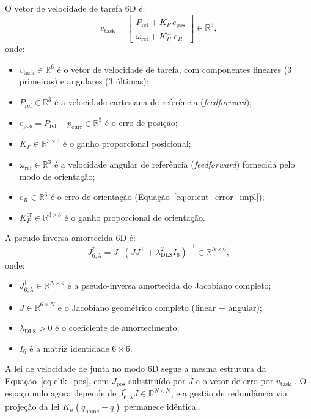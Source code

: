 O vetor de velocidade de tarefa 6D é:
\begin{equation}
    v_{\text{task}} = \begin{bmatrix} \dot{P}_{\text{ref}} + K_P\,e_{\text{pos}} \\ \omega_{\text{ref}} + K_P^{\text{or}}\,e_R \end{bmatrix} \in \mathbb{R}^6,
    \label{eq:task_vel_6d}
\end{equation}
onde:
\begin{itemize}
    \item $v_{\text{task}} \in \mathbb{R}^6$ é o vetor de velocidade de tarefa, com componentes lineares (3 primeiras) e angulares (3 últimas);
    \item $\dot{P}_{\text{ref}} \in \mathbb{R}^3$ é a velocidade cartesiana de referência (\textit{feedforward});
    \item $e_{\text{pos}} = P_{\text{ref}} - p_{\text{curr}} \in \mathbb{R}^3$ é o erro de posição;
    \item $K_P \in \mathbb{R}^{3\times 3}$ é o ganho proporcional posicional;
    \item $\omega_{\text{ref}} \in \mathbb{R}^3$ é a velocidade angular de referência (\textit{feedforward}) fornecida pelo modo de orientação;
    \item $e_R \in \mathbb{R}^3$ é o erro de orientação (Equação~\eqref{eq:orient_error_impl});
    \item $K_P^{\text{or}} \in \mathbb{R}^{3\times 3}$ é o ganho proporcional de orientação.
\end{itemize}

A pseudo-inversa amortecida 6D é:
\begin{equation}
    J_{6,\lambda}^{\dagger} = J^\top\left(JJ^\top + \lambda_{\text{DLS}}^2 I_6\right)^{-1} \in \mathbb{R}^{N \times 6},
    \label{eq:dls_6d}
\end{equation}
onde:
\begin{itemize}
    \item $J_{6,\lambda}^{\dagger} \in \mathbb{R}^{N \times 6}$ é a pseudo-inversa amortecida do Jacobiano completo;
    \item $J \in \mathbb{R}^{6 \times N}$ é o Jacobiano geométrico completo (linear + angular);
    \item $\lambda_{\text{DLS}} > 0$ é o coeficiente de amortecimento;
    \item $I_6$ é a matriz identidade $6 \times 6$.
\end{itemize}
A lei de velocidade de junta no modo 6D segue a mesma estrutura da Equação~\eqref{eq:clik_pos}, com $J_{\text{pos}}$ substituído por $J$ e o vetor de erro por $v_{\text{task}}$ \cite{chiaverini1994review, chiaverini1997singularity}. O espaço nulo agora depende de $J_{6,\lambda}^{\dagger} J \in \mathbb{R}^{N \times N}$, e a gestão de redundância via projeção da lei $K_n(q_{\text{home}} - q)$ permanece idêntica \cite{liegeois1977automatic}.

